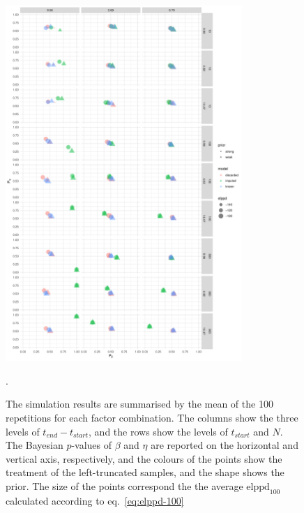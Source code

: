 \begin{figure}[t]
    \centering
    \includegraphics[width=0.8\textwidth]{./figures/ch-2/sim-results-pvalues.pdf}
    \caption{The simulation results are summarised by the mean of the 100 repetitions for each factor combination. The columns show the three levels of $t_{end} - t_{start}$, and the rows show the levels of $t_{start}$ and $N$. The Bayesian $p$-values of $\beta$ and $\eta$ are reported on the horizontal and vertical axis, respectively, and the colours of the points show the treatment of the left-truncated samples, and the shape shows the prior. The size of the points correspond the the average $\text{elppd}_{100}$ calculated according to eq.~\eqref{eq:elppd-100}}.
    \label{fig:sim-study-pvalue}
\end{figure}

